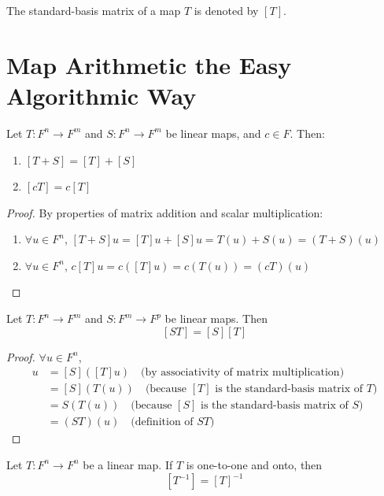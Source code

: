 \begin{notation} The standard-basis matrix of a map $T$ is denoted by $[T]$.
\end{notation}

 \section{Map
Arithmetic the Easy Algorithmic Way}

\begin{theorem}\label{thm:sum-scalar-mbas} Let
$T: F^n \to F^m$ and $S: F^n \to F^m$ be linear maps, and $c \in F$. Then:
\begin{enumerate}[label=(\roman*)] \item $[T + S] = [T] + [S]$ \item $[cT] =
c[T]$ \end{enumerate} \end{theorem}

\begin{proof} By properties of matrix addition and scalar multiplication:
\begin{enumerate}[label=(\roman*)] \item $\forall u \in F^n$, $[T + S]u = [T]u +
[S]u = T(u) + S(u) = (T + S)(u)$ \item $\forall u \in F^n$, $c[T]u = c([T]u) =
c(T(u)) = (cT)(u)$ \end{enumerate} \end{proof}

\begin{theorem}\label{thm:product-mbas} Let $T: F^n \to F^m$
and $S: F^m \to F^p$ be linear maps. Then \[ [ST] = [S][T] \] \end{theorem}

\begin{proof} $\forall u \in F^n$, \begin{align*} [S][T]u &= [S]([T]u) \quad
\text{(by associativity of matrix multiplication)} \\ &= [S](T(u)) \quad
\text{(because $[T]$ is the standard-basis matrix of $T$)} \\ &= S(T(u)) \quad
\text{(because $[S]$ is the standard-basis matrix of $S$)} \\ &= (ST)(u) \quad
\text{(definition of $ST$)} \end{align*} \end{proof}

\begin{theorem}[Inverse]\label{thm:inverse-mbas} Let $T: F^n \to F^n$ be a
linear map. If $T$ is one-to-one and onto, then \[ [T^{-1}] = [T]^{-1} \]
\end{theorem}

